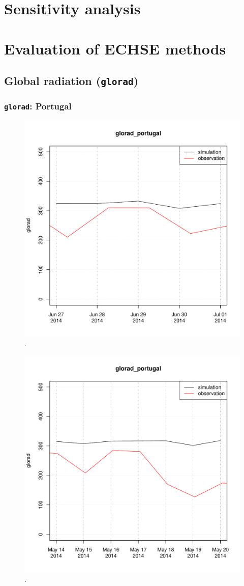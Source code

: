 \documentclass{scrreprt}
\begin{document}
\chapter{Sensitivity analysis} \label{ch:sensana}


\chapter{Evaluation of ECHSE methods} \label{ch:methodcomp}

\section{Global radiation (\texttt{glorad})}

\subsection{\texttt{glorad}: Portugal}

\begin{figure}[ht]
  \centering
  \includegraphics[width=0.5\hsize]{./plot_glorad_compare_portugal_HS_2014-06-26_2014-07-01.pdf}
  \caption{.}
  \label{fig:portugal_HS_glorad1}
\end{figure}

\begin{figure}[ht]
  \centering
  \includegraphics[width=0.5\hsize]{./plot_glorad_compare_portugal_NSA_2014-05-13_2014-05-20.pdf}
  \caption{.}
  \label{fig:portugal_NSA_glorad1}
\end{figure}
\end{document}

